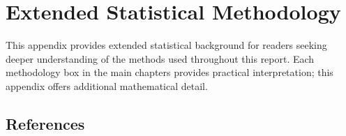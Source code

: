 \documentclass[11pt, a4paper]{report}
\begin{document}
\newpage
{}














\newpage
\appendix
\chapter{Extended Statistical Methodology}
\label{app:methodology}

This appendix provides extended statistical background for readers seeking deeper understanding of the methods used throughout this report. Each methodology box in the main chapters provides practical interpretation; this appendix offers additional mathematical detail.

\begingroup
\footnotesize
\setlength{\parskip}{0.2ex}

\endgroup

\newpage
\section*{References}
\end{document}
